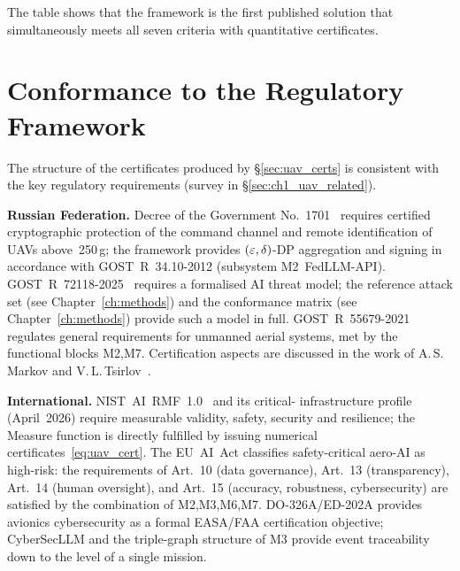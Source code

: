 The table shows that the framework is the first published solution
that simultaneously meets all seven criteria with quantitative
certificates.

\section{Conformance to the Regulatory Framework}
\label{sec:uav_regulation}

The structure of the certificates produced by \S\ref{sec:uav_certs}
is consistent with the key regulatory requirements
(survey in \S\ref{sec:ch1_uav_related}).

\noindent\textbf{Russian Federation.}
Decree of the Government No.~1701~\cite{decree_1701} requires
certified cryptographic protection of the command channel and remote
identification of UAVs above~250\,g; the framework provides
$(\varepsilon,\delta)$-DP aggregation and signing in accordance with
\mbox{GOST~R~34.10-2012} (subsystem \textsf{M2~FedLLM-API}).
\mbox{GOST~R~72118-2025}~\cite{GOST_R_72118_2025} requires a
formalised AI threat model; the reference attack set
(see Chapter~\ref{ch:methods}) and the conformance matrix
(see Chapter~\ref{ch:methods}) provide such a model in full.
\mbox{GOST~R~55679-2021}~\cite{GOST_R_55679_2021} regulates general
requirements for unmanned aerial systems, met by the functional
blocks \textsf{M2,M7}. Certification aspects are discussed in the
work of A.\,S.\,Markov and V.\,L.\,Tsirlov~\cite{Markov2023certify}.

\noindent\textbf{International.}
\mbox{NIST~AI~RMF~1.0}~\cite{nist_rmf_2023} and its critical-
infrastructure profile (April~2026) require measurable validity,
safety, security and resilience; the \textsf{Measure} function is
directly fulfilled by issuing numerical
certificates~\eqref{eq:uav_cert}. The \mbox{EU~AI~Act} classifies
safety-critical aero-AI as high-risk: the requirements of Art.~10
(data governance), Art.~13 (transparency), Art.~14 (human oversight),
and Art.~15 (accuracy, robustness, cybersecurity) are satisfied by
the combination of \textsf{M2,M3,M6,M7}. \mbox{DO-326A/ED-202A}
\cite{do_326a_2024} provides avionics cybersecurity as a formal
EASA/FAA certification objective; \textsf{CyberSecLLM} and the
triple-graph structure of \textsf{M3} provide event traceability
down to the level of a single mission.

